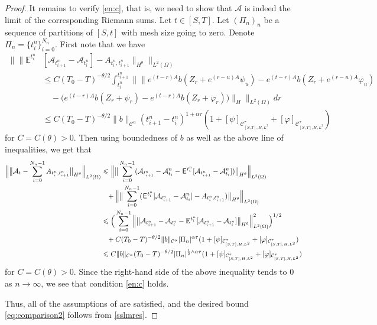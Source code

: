 \documentclass[11pt,a4paper]{article}
\def\E{\hskip.15ex\mathsf{E}\hskip.10ex}
\newcommand{\A}{\mathcal{A}}
\newcommand{\C}{\mathcal{C}}
\newcommand{\cC}{\mathcal{C}}
\newcommand{\Op}{A}
\newcommand{\EE}{\mathbb{E}}
\renewcommand{\phi}{\varphi}
\renewcommand{\le}{\leqslant}
\numberwithin{equation}{section}
\let\cref\crtcref
\theoremstyle{definition}
\theoremstyle{remark}
\theoremstyle{plain}
\begin{document}
\begin{proof}
It remains to verify \ref{en:c}, that is, we need to show that $\mathcal{A}$ is indeed the limit of the corresponding Riemann sums. Let $t \in [S,T]$. Let $(\Pi_n)_n$ be a sequence of partitions of $[S,t]$ with mesh size going to zero. Denote $\Pi_n=\{t_i^n\}_{i=0}^{N_n}$. First note that we have
\begin{align*}
    \big\|\|\EE^{t_i^n}&[\mathcal{A}_{t_{i+1}^n}-\mathcal{A}_{t_i^n}]-A_{t_i^n,t_{i+1}^n}\|_{H^\theta}\big\|_{L^2(\Omega)}\\
    &\leqslant C (T_0-T)^{-\theta/2}\int_{t_i^n}^{t_{i+1}^n}\Big\|\Big\|e^{(t-r)\Op} b(Z_r+e^{(r-u)\Op}\psi_{u}) - e^{(t-r)\Op} b(Z_r+e^{(r-u)\Op}\phi_{u}) \\
    &\quad- \Big(e^{(t-r)\Op} b(Z_r+\psi_r)-e^{(t-r)\Op}b(Z_r+\phi_r)\Big)\Big\|_H\Big\|_{L^2(\Omega)} dr\\
    &\leqslant C (T_0-T)^{-\theta/2}\|b\|_{\cC^\alpha} (t_{i+1}^n-t_i^n)^{1+\alpha \tau}(1+[\psi]_{\cC^{\tau}_{[S,T],H,L^2}}+[\phi]_{\cC^{\tau}_{[S,T],H,L^2}})
\end{align*}
for $C=C(\theta)>0$.
Then using boundedness of $b$ as well as the above line of inequalities, we get that
\begin{align*}
\Big\|\big\|\mathcal{A}_t-\sum_{i=0}^{N_{n}-1}A_{t_i^n,t_{i+1}^n}\big\|_{H^\theta}\Big\|_{L^2(\Omega)}&\le \Big\|\big\|\sum_{i=0}^{N_{n}-1}(\A_{t_{i+1}^n}-\A_{t_i}^n-\E^{t_i^n}[\A_{t_{i+1}^n}-\A_{t_i}^n])\big\|_{H^\theta}\Big\|_{L^2(\Omega)}\\
&\phantom{\le}+\Big\|\big\|\sum_{i=0}^{N_{n}-1}(\E^{t_i^n}[\A_{t_{i+1}^n}-\A_{t_i}^n]-A_{t_i^n,t_{i+1}^n})\big\|_{H^\theta}\Big\|_{L^2(\Omega)} \\
&\le  
\Big(\sum_{i=0}^{N_{n}-1}\Big\|\big\| \mathcal{A}_{t_{i+1}^n}-\mathcal{A}_{t_i^n}- \EE^{t_i^n}[\mathcal{A}_{t_{i+1}^n}-\mathcal{A}_{t_i^n}]\big\|_{H^\theta}\Big\|^2_{L^2(\Omega)} \Big)^{1/2}\\  &\phantom{\le}+C (T_0-T)^{-\theta/2}\|b\|_{\cC^\alpha} |\Pi_n|^{\alpha \tau}(1+[\psi]_{\cC^{\tau}_{[S,T],H,L^2}}+[\phi]_{\cC^{\tau}_{[S,T],H,L^2}}) \\
&\le C \|b\|_{\C^\alpha} (T_0-T)^{-\theta/2}|\Pi_n|^{\frac12\wedge\alpha\tau}(1+[\psi]_{\cC^{\tau}_{[S,T],H,L^2}}+[\phi]_{\cC^{\tau}_{[S,T],H,L^2}})
\end{align*}
for $C=C(\theta)>0$. Since the right-hand side of the above inequality tends to $0$ as $n\to\infty$, we see that condition \ref{en:c} holds.

Thus, all of the assumptions of \cref{lem:SSL} are satisfied, and the desired bound  \eqref{eq:comparison2} follows from \eqref{sslmres}.
\end{proof}
\end{document}
